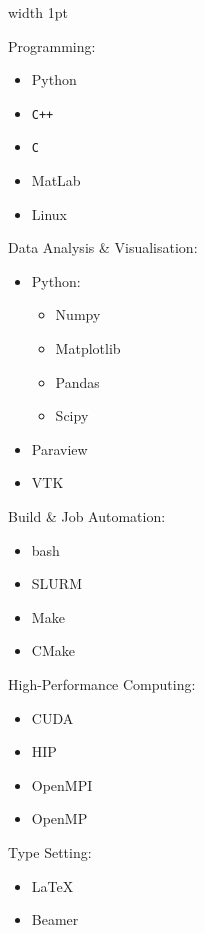 \documentclass{cv}
\begin{document}
\vrule width 1pt
\hspace{0.01\textwidth}
\begin{minipage}[t]{0.3\textwidth}
	\vspace{0pt}
	\cvbodysz
	\vspace{3pt}
	\cvlargesz Programming:
	\begin{itemize}[font=\cvlargesz]
		\item Python
		\item \texttt{C++}
		\item \texttt{C}
		\item MatLab
		\item Linux
	\end{itemize}
	\vspace{15pt}
	\cvlargesz Data Analysis \& Visualisation:
	\begin{itemize}[font=\cvlargesz]
		\item Python:
		\begin{itemize}
			\item Numpy
			\item Matplotlib
			\item Pandas
			\item Scipy
		\end{itemize}
		\item Paraview
		\item VTK
	\end{itemize}
	\vspace{15pt}
	\cvlargesz Build \& Job Automation:
	\begin{itemize}[font=\cvlargesz]
		\item bash
		\item SLURM
		\item Make
		\item CMake
	\end{itemize}
	\vspace{15pt}
	\cvlargesz High-Performance Computing:
	\begin{itemize}[font=\cvlargesz]
		\item CUDA
		\item HIP
		\item OpenMPI
		\item OpenMP
	\end{itemize}
	\vspace{15pt}
	\cvlargesz Type Setting:
	\begin{itemize}[font=\cvlargesz]
		\item \LaTeX
		\item Beamer

\end{itemize}
\end{minipage}
\end{document}
